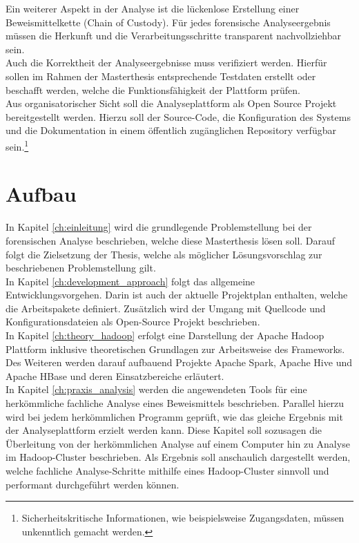 \documentclass[11pt,a4paper]{report} %
\begin{document}
\noindent
Ein weiterer Aspekt in der Analyse ist die lückenlose Erstellung einer Beweismittelkette (Chain of Custody). Für jedes forensische Analyseergebnis müssen die Herkunft und die Verarbeitungsschritte transparent nachvollziehbar sein. \\

\noindent
Auch die Korrektheit der Analyseergebnisse muss verifiziert werden. Hierfür sollen im Rahmen der Masterthesis entsprechende Testdaten erstellt oder beschafft werden, welche die Funktionsfähigkeit der Plattform prüfen. \\

\noindent
Aus organisatorischer Sicht soll die Analyseplattform als Open Source Projekt bereitgestellt werden. Hierzu soll der Source-Code, die Konfiguration des Systems und die Dokumentation in einem öffentlich zugänglichen Repository verfügbar sein.\footnote{Sicherheitskritische Informationen, wie beispielsweise Zugangsdaten, müssen unkenntlich gemacht werden.}


\section{Aufbau}
In Kapitel \ref{ch:einleitung} wird die grundlegende Problemstellung bei der forensischen Analyse beschrieben, welche diese Masterthesis lösen soll. Darauf folgt die Zielsetzung der Thesis, welche als möglicher Lösungsvorschlag zur beschriebenen Problemstellung gilt.\\
In Kapitel \ref{ch:development_approach} folgt das allgemeine Entwicklungsvorgehen. Darin ist auch der aktuelle Projektplan enthalten, welche die Arbeitspakete definiert.
Zusätzlich wird der Umgang mit Quellcode und Konfigurationsdateien als Open-Source Projekt beschrieben.\\

\noindent
In Kapitel \ref{ch:theory_hadoop} erfolgt eine Darstellung der Apache Hadoop Plattform inklusive theoretischen Grundlagen zur Arbeitsweise des Frameworks. Des Weiteren werden darauf aufbauend Projekte Apache Spark, Apache Hive und Apache HBase und deren Einsatzbereiche erläutert.\\

\noindent
In Kapitel \ref{ch:praxis_analysis} werden die angewendeten Tools für eine herkömmliche fachliche Analyse eines Beweismittels beschrieben. Parallel hierzu wird bei jedem herkömmlichen Programm geprüft, wie das gleiche Ergebnis mit der Analyseplattform erzielt werden kann. Diese Kapitel soll sozusagen die Überleitung von der herkömmlichen Analyse auf einem Computer hin zu Analyse im Hadoop-Cluster beschrieben. Als Ergebnis soll anschaulich dargestellt werden, welche fachliche Analyse-Schritte mithilfe eines Hadoop-Cluster sinnvoll und performant durchgeführt werden können.\\
\end{document}
